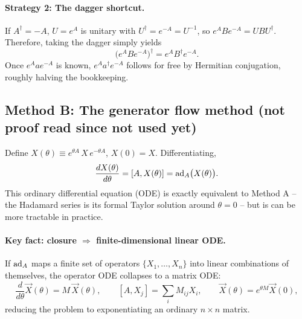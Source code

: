 \documentclass[../../main.tex]{subfiles}
\begin{document}
\paragraph{Strategy 2: The dagger shortcut.}
If $A^\dagger=-A$, $U=e^A$ is unitary with $U^\dagger=e^{-A}=U^{-1}$, so
$e^{A}Be^{-A}=UBU^\dagger$. Therefore, taking the dagger simply yields
\begin{equation}
\big(e^{A}Be^{-A}\big)^\dagger = e^{A}B^\dagger e^{-A}.
\end{equation}
Once $e^{A}ae^{-A}$ is known, $e^{A}a^\dagger e^{-A}$ follows for free by Hermitian
conjugation, roughly halving the bookkeeping.

\subsection{Method B: The generator flow method (not proof read since not used yet)}

Define $X(\theta)\equiv e^{\theta A}\,X\,e^{-\theta A}$, $X(0)=X$. Differentiating,
\begin{equation}
\frac{dX(\theta)}{d\theta}=[A,X(\theta)]=\mathrm{ad}_A\big(X(\theta)\big).
\end{equation}
This ordinary differential equation (ODE) is exactly equivalent to Method A -- the Hadamard series is its formal Taylor solution around $\theta=0$ -- but is can be more tractable in practice.

\paragraph{Key fact: closure $\Rightarrow$ finite-dimensional linear ODE.}
If $\mathrm{ad}_A$ maps a finite set of operators $\{X_1,\dots,X_n\}$ into linear combinations
of themselves, the operator ODE collapses to a matrix ODE:
\begin{equation}
\frac{d}{d\theta}\vec X(\theta)=M\,\vec X(\theta),\qquad
[A,X_j]=\sum_iM_{ij}X_i,\qquad \vec X(\theta)=e^{\theta M}\vec X(0),
\end{equation}
reducing the problem to exponentiating an ordinary $n\times n$ matrix.

\end{document}
